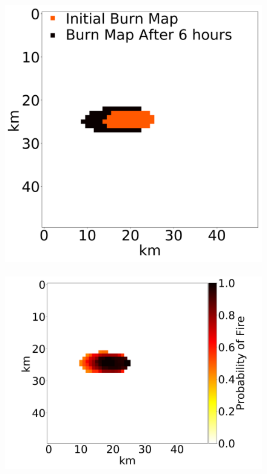 \documentclass[smallcondensed]{svjour3}     %
\begin{document}
\begin{figure}[htbp]
	\includegraphics[height=0.17\textheight]{exampleFusedFire4.png}
	~
	\includegraphics[height=0.17\textheight]{exampleNetworkProcessed4.png}
	~

\end{figure}
\end{document}
